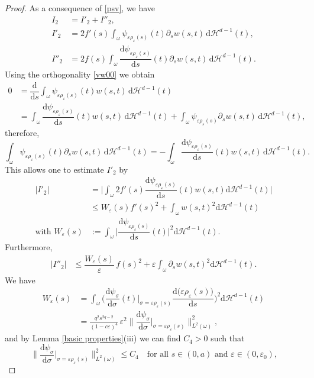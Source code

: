 \documentclass[11pt,oneside,reqno,a4paper]{amsart}
\newcommand{\dd}{\mathrm{d}}
\renewcommand{\H}{\mathcal{H}}
\newcommand{\eps}{\varepsilon}
\theoremstyle{definition}
\begin{document}
\begin{proof}
As a consequence of \eqref{psv}, we have
\begin{align*}
	I_2&=I'_2+I''_2,\\
	I'_2&=2f'(s)\int_\omega \psi_{\eps \rho_\eps(s)}(t)\partial_s w(s,t)\,\dd\H^{d-1}(t),\\
	I''_2&=2f(s)\int_\omega \dfrac{\dd\psi_{\eps \rho_\eps(s)}}{\dd s}(t)\partial_s w(s,t)\,\dd\H^{d-1}(t).
\end{align*}
Using the orthogonality \eqref{vw00} we obtain
\begin{align*}
0&=\dfrac{\dd }{\dd s} \int_\omega \psi_{\eps \rho_\eps(s)}(t) w(s,t)\,\dd\H^{d-1}(t)\\
&=\int_\omega \dfrac{\dd\psi_{\eps \rho_\eps(s)}}{\dd s}(t) w(s,t)\,\dd\H^{d-1}(t)
+\int_\omega \psi_{\eps \rho_\eps(s)}\partial_s w(s,t)\,\dd\H^{d-1}(t),
\end{align*}
therefore,
\[
\int_\omega \psi_{\eps \rho_\eps(s)}(t)\partial_s w(s,t)\,\dd\H^{d-1}(t)=-\int_\omega 
\dfrac{\dd\psi_{\eps \rho_\eps(s)}}{\dd s}(t)  w(s,t)\,\dd\H^{d-1}(t).
\]
This allows one to estimate $I'_2$ by
\begin{align*}
	|I'_2|&=\bigg|\int_\omega 2f'(s)\dfrac{\dd\psi_{\eps \rho_\eps(s)}}{\dd s}(t) w(s,t)\dd\H^{d-1}(t)\bigg|\\
	&\le
	W_\eps(s) f'(s)^2 +\int_\omega w(s,t)^2\dd\H^{d-1}(t)\\
	\text{with }W_\eps(s)&:=\int_\omega\bigg|\dfrac{\dd\psi_{\eps \rho_\eps(s)}}{\dd s}(t)\bigg|^2\dd\H^{d-1}(t).
\end{align*}
Furthermore,
\begin{align*}
	|I''_2|&\le \dfrac{W_\eps(s)}{\eps}\, f(s)^2+ \eps \int_\omega \partial_s w(s,t)^2\dd\H^{d-1}(t).
\end{align*}	
We have 
\begin{equation*}
	\begin{split}
		W_\eps(s)
		&=\int_{\omega}\bigg(\dfrac{\dd \psi_\sigma}{\dd\sigma}(t)\Big|_{\sigma=\eps\rho_\eps(s)}
		\dfrac{\dd\big(\eps \rho_\eps(s)\big)}{\dd s}\bigg)^2\dd\H^{d-1}(t)
		\\
		&=\frac{q^2s^{2q-2}}{(1-c\eps)^4}\,\eps^2\bigg\|\dfrac{\dd \psi_\sigma}{\dd\sigma}\Big|_{\sigma=\eps\rho_\eps(s)}\bigg\|^2_{L^2(\omega)},
	\end{split}
\end{equation*}
and by Lemma \ref{basic properties}(iii) we can find $C_4>0$ such that
\[
\bigg\|\dfrac{\dd \psi_\sigma}{\dd\sigma}\Big|_{\sigma=\eps\rho_\eps(s)}\bigg\|^2_{L^2(\omega)}\le C_4 \quad\text{for all $s\in(0,a)$ and $\eps\in(0,\eps_0)$,}
\]
\end{proof}
\end{document}
